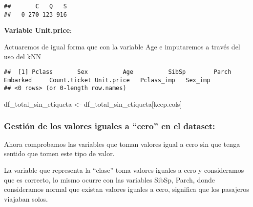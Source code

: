 \documentclass[
]{article}
\newenvironment{Shaded}{\begin{snugshade}}{\end{snugshade}}
\newcommand{\CommentTok}[1]{\textcolor[rgb]{0.50,0.62,0.50}{#1}}
\newcommand{\DataTypeTok}[1]{\textcolor[rgb]{0.87,0.87,0.75}{#1}}
\newcommand{\DecValTok}[1]{\textcolor[rgb]{0.86,0.86,0.80}{#1}}
\newcommand{\KeywordTok}[1]{\textcolor[rgb]{0.94,0.87,0.69}{#1}}
\newcommand{\NormalTok}[1]{\textcolor[rgb]{0.80,0.80,0.80}{#1}}
\newcommand{\OperatorTok}[1]{\textcolor[rgb]{0.94,0.94,0.82}{#1}}
\newcommand{\StringTok}[1]{\textcolor[rgb]{0.80,0.58,0.58}{#1}}
\begin{document}
\begin{verbatim}
##       C   Q   S 
##   0 270 123 916
\end{verbatim}

\textbf{Variable Unit.price}:

Actuaremos de igual forma que con la variable Age e imputaremos a través
del uso del kNN

\begin{Shaded}
\end{Shaded}

\begin{verbatim}
##  [1] Pclass       Sex          Age          SibSp        Parch        Embarked     Count.ticket Unit.price   Pclass_imp   Sex_imp     
## <0 rows> (or 0-length row.names)
\end{verbatim}

\begin{Shaded}
\begin{Highlighting}[]
\NormalTok{df_total_sin_etiqueta <-}\StringTok{ }\NormalTok{df_total_sin_etiqueta[keep.cols]}
\end{Highlighting}
\end{Shaded}

\hypertarget{gestiuxf3n-de-los-valores-iguales-a-cero-en-el-dataset}{%
\subsubsection{\texorpdfstring{\textbf{Gestión de los valores iguales a
``cero'' en el
dataset}:}{Gestión de los valores iguales a ``cero'' en el dataset:}}\label{gestiuxf3n-de-los-valores-iguales-a-cero-en-el-dataset}}

Ahora comprobamos las variables que toman valores igual a cero sin que
tenga sentido que tomen este tipo de valor.

La variable que representa la ``clase'' toma valores iguales a cero y
consideramos que es correcto, lo mismo ocurre con las variables SibSp,
Parch, donde consideramos normal que existan valores iguales a cero,
significa que los pasajeros viajaban solos.
\end{document}
